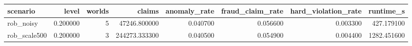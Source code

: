 \begin{tabular}{lrrrrrrr}
\toprule
scenario & level & worlds & claims & anomaly\_rate & fraud\_claim\_rate & hard\_violation\_rate & runtime\_s \\
\midrule
rob\_noisy & 0.200000 & 5 & 47246.800000 & 0.040700 & 0.056600 & 0.003300 & 427.179100 \\
rob\_scale500 & 0.200000 & 3 & 244273.333300 & 0.040500 & 0.054900 & 0.004400 & 1282.451600 \\
\bottomrule
\end{tabular}
